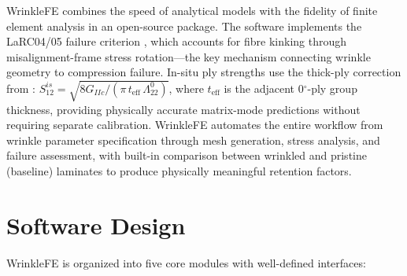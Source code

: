 \documentclass[10pt,a4paper]{article}
\begin{document}
WrinkleFE combines the speed of analytical models with the fidelity of finite element analysis in an open-source package.
The software implements the LaRC04/05 failure criterion \citep{Pinho2005}, which accounts for fibre kinking through misalignment-frame stress rotation---the key mechanism connecting wrinkle geometry to compression failure.
In-situ ply strengths use the thick-ply correction from \citet{Camanho2006}: $S_{12}^{is} = \sqrt{8G_{IIc}/(\pi\,t_{\text{eff}}\,\Lambda_{22}^0)}$, where $t_{\text{eff}}$ is the adjacent 0$^\circ$-ply group thickness, providing physically accurate matrix-mode predictions without requiring separate calibration.
WrinkleFE automates the entire workflow from wrinkle parameter specification through mesh generation, stress analysis, and failure assessment, with built-in comparison between wrinkled and pristine (baseline) laminates to produce physically meaningful retention factors.

\section*{Software Design}

WrinkleFE is organized into five core modules with well-defined interfaces:
\end{document}
